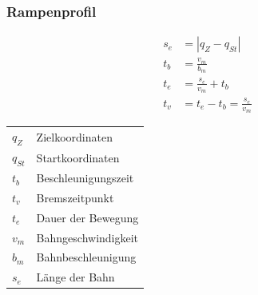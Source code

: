 \subsubsection{Rampenprofil }
\begin{minipage}{0.4\linewidth}
    \begin{align*}
        s_e &= |q_Z - q_{St}|\\
        t_b &= \frac{v_m}{b_m}\\
        t_e &= \frac{s_e}{v_m}+t_b\\
        t_v &= t_e - t_b = \frac{s_e}{v_m}
    \end{align*}
        \begin{tabular}{ll}
        $q_Z$ & Zielkoordinaten\\
        $q_{St}$& Startkoordinaten\\
        $t_b$ & Beschleunigungszeit\\
        $t_v$ & Bremszeitpunkt \\
        $t_e$ & Dauer der Bewegung\\
        $v_m$ & Bahngeschwindigkeit\\
        $b_m$ & Bahnbeschleunigung\\
        $s_e$ & Länge der Bahn\\
    \end{tabular}
\end{minipage}
